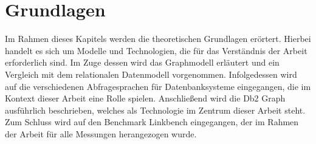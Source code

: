 \chapter{Grundlagen}
Im Rahmen dieses Kapitels werden die theoretischen Grundlagen erörtert. Hierbei handelt es sich um Modelle und Technologien, die für das Verständnis der Arbeit erforderlich sind. Im Zuge dessen wird das Graphmodell erläutert und ein Vergleich mit dem relationalen Datenmodell vorgenommen. Infolgedessen wird auf die verschiedenen Abfragesprachen für Datenbanksysteme eingegangen, die im Kontext dieser Arbeit eine Rolle spielen. Anschließend wird die Db2 Graph ausführlich beschrieben, welches als Technologie im Zentrum dieser Arbeit steht. Zum Schluss wird auf den Benchmark Linkbench eingegangen, der im Rahmen der Arbeit für alle Messungen herangezogen wurde.






